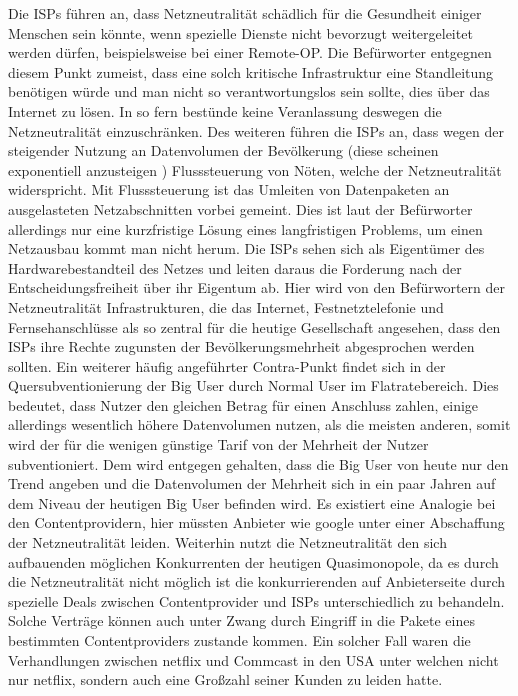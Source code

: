 \documentclass[
	12pt,
	a4paper,
	BCOR10mm,
	DIV14,
	listof=totoc,
	bibliography=totoc,
	headsepline
]{scrreprt}
\begin{document}
Die ISPs führen an, dass Netzneutralität schädlich für die Gesundheit einiger Menschen sein könnte, wenn spezielle Dienste nicht bevorzugt weitergeleitet werden dürfen, beispielsweise bei einer Remote-OP.
Die Befürworter entgegnen diesem Punkt zumeist, dass eine solch kritische Infrastruktur eine Standleitung benötigen würde und man nicht so verantwortungslos sein sollte, dies über das Internet zu lösen.
In so fern bestünde keine Veranlassung deswegen die Netzneutralität einzuschränken.
Des weiteren führen die ISPs an, dass wegen der steigender Nutzung an Datenvolumen der Bevölkerung (diese scheinen exponentiell anzusteigen \cite{nnIrrtum}) Flusssteuerung von Nöten, welche der Netzneutralität widerspricht.
Mit Flusssteuerung ist das Umleiten von Datenpaketen an ausgelasteten Netzabschnitten vorbei gemeint.
Dies ist laut der Befürworter allerdings nur eine kurzfristige Lösung eines langfristigen Problems, um einen Netzausbau kommt man nicht herum.
Die ISPs sehen sich als Eigentümer des Hardwarebestandteil des Netzes und leiten daraus die Forderung nach der Entscheidungsfreiheit über ihr Eigentum ab.
Hier wird von den Befürwortern der Netzneutralität Infrastrukturen, die das Internet, Festnetztelefonie und Fernsehanschlüsse als so zentral für die heutige Gesellschaft angesehen, dass den ISPs ihre Rechte zugunsten der Bevölkerungsmehrheit abgesprochen werden sollten.
Ein weiterer häufig angeführter Contra-Punkt findet sich in der Quersubventionierung der Big User durch Normal User im Flatratebereich. 
Dies bedeutet, dass Nutzer den gleichen Betrag für einen Anschluss zahlen, einige allerdings wesentlich höhere Datenvolumen nutzen, als die meisten anderen, somit wird der für die wenigen günstige Tarif von der Mehrheit der Nutzer subventioniert.
Dem wird entgegen gehalten, dass die Big User von heute nur den Trend angeben und die Datenvolumen der Mehrheit sich in ein paar Jahren auf dem Niveau der heutigen Big User befinden wird.
Es existiert eine Analogie bei den Contentprovidern, hier müssten Anbieter wie google unter einer Abschaffung der Netzneutralität leiden.
Weiterhin nutzt die Netzneutralität den sich aufbauenden möglichen Konkurrenten der heutigen Quasimonopole, da es durch die Netzneutralität nicht möglich ist die konkurrierenden auf Anbieterseite durch spezielle Deals zwischen Contentprovider und ISPs unterschiedlich zu behandeln. 
Solche Verträge können auch unter Zwang durch Eingriff in die Pakete eines bestimmten Contentproviders zustande kommen. 
Ein solcher Fall waren die Verhandlungen zwischen netflix und Commcast in den USA \cite{nfvcc} unter welchen nicht nur netflix, sondern auch eine Großzahl seiner Kunden zu leiden hatte.
\end{document}
